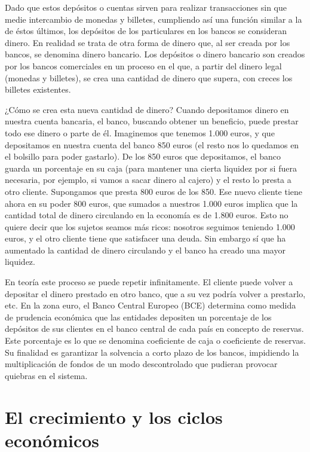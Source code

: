 \documentclass[
]{krantz}
\begin{document}
Dado que estos depósitos o cuentas sirven para realizar transacciones sin que medie intercambio de monedas y billetes, cumpliendo así una función similar a la de éstos últimos, los depósitos de los particulares en los bancos se consideran dinero. En realidad se trata de otra forma de dinero que, al ser creada por los bancos, se denomina dinero bancario. Los depósitos o dinero bancario son creados por los bancos comerciales en un proceso en el que, a partir del dinero legal (monedas y billetes), se crea una cantidad de dinero que supera, con creces los billetes existentes.

¿Cómo se crea esta nueva cantidad de dinero? Cuando depositamos dinero en nuestra cuenta bancaria, el banco, buscando obtener un beneficio, puede prestar todo ese dinero o parte de él. Imaginemos que tenemos 1.000 euros, y que depositamos en nuestra cuenta del banco 850 euros (el resto nos lo quedamos en el bolsillo para poder gastarlo). De los 850 euros que depositamos, el banco guarda un porcentaje en su caja (para mantener una cierta liquidez por si fuera necesaria, por ejemplo, si vamos a sacar dinero al cajero) y el resto lo presta a otro cliente. Supongamos que presta 800 euros de los 850. Ese nuevo cliente tiene ahora en su poder 800 euros, que sumados a nuestros 1.000 euros implica que la cantidad total de dinero circulando en la economía es de 1.800 euros. Esto no quiere decir que los sujetos seamos más ricos: nosotros seguimos teniendo 1.000 euros, y el otro cliente tiene que satisfacer una deuda. Sin embargo sí que ha aumentado la cantidad de dinero circulando y el banco ha creado una mayor liquidez.

En teoría este proceso se puede repetir infinitamente. El cliente puede volver a depositar el dinero prestado en otro banco, que a su vez podría volver a prestarlo, etc. En la zona euro, el Banco Central Europeo (BCE) determina como medida de prudencia económica que las entidades depositen un porcentaje de los depósitos de sus clientes en el banco central de cada país en concepto de reservas. Este porcentaje es lo que se denomina coeficiente de caja o coeficiente de reservas. Su finalidad es garantizar la solvencia a corto plazo de los bancos, impidiendo la multiplicación de fondos de un modo descontrolado que pudieran provocar quiebras en el sistema.

\hypertarget{el-crecimiento-y-los-ciclos-econuxf3micos}{%
\chapter{El crecimiento y los ciclos económicos}\label{el-crecimiento-y-los-ciclos-econuxf3micos}}
\end{document}
